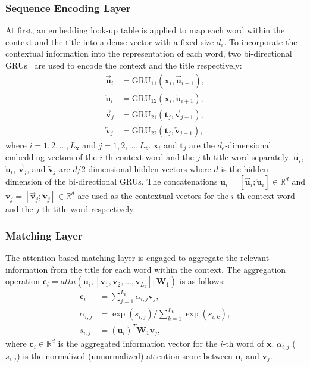 \documentclass[letterpaper]{article} %
\begin{document}
\subsubsection{Sequence Encoding Layer}
At first, an embedding look-up table is applied to map each word within the context and the title into a dense vector with a fixed size $d_e$. To incorporate the contextual information into the representation of each word, two bi-directional GRUs~\cite{cho2014learning} are used to encode the context and the title respectively:
\begin{align}
\overrightarrow{\textbf{u}}_i &= \text{GRU}_{11}(\textbf{x}_i, \overrightarrow{\textbf{u}}_{i-1}), \\
\overleftarrow{\textbf{u}}_i  &= \text{GRU}_{12}(\textbf{x}_i, \overleftarrow{\textbf{u}}_{i+1}), \\
\overrightarrow{\textbf{v}}_j &= \text{GRU}_{21}(\textbf{t}_j, \overrightarrow{\textbf{v}}_{j-1}),\\
\overleftarrow{\textbf{v}}_j  &= \text{GRU}_{22}(\textbf{t}_j, \overleftarrow{\textbf{v}}_{j+1}),
\end{align}
where $i=1,2,\dots,L_{\mathbf{x}}$ and $j=1,2,\dots,L_{\mathbf{t}}$. $\mathbf{x}_i$ and $\mathbf{t}_j$ are the $d_e$-dimensional embedding vectors of the $i$-th context word and the $j$-th title word separately. $\overrightarrow{\textbf{u}}_i$, $\overleftarrow{\textbf{u}}_i$, $\overrightarrow{\textbf{v}}_j$, and $\overleftarrow{\textbf{v}}_j$ are $d/2$-dimensional hidden vectors where $d$ is the hidden dimension of the bi-directional GRUs. The concatenations $\mathbf{u}_i = [\overrightarrow{\mathbf{u}}_i; \overleftarrow{\mathbf{u}}_i] \in \mathbb{R}^d$ and $\mathbf{v}_j = [\overrightarrow{\mathbf{v}}_j; \overleftarrow{\mathbf{v}}_j] \in \mathbb{R}^d$ are used as the contextual vectors for the $i$-th context word and the $j$-th title word respectively.

\subsubsection{Matching Layer}
The attention-based matching layer is engaged to aggregate the relevant information from the title for each word within the context. The aggregation operation $\mathbf{c}_i = attn(\mathbf{u}_i, [\mathbf{v}_1, \mathbf{v}_2,\dots, \mathbf{v}_{L_{\mathbf{t}}}]; \mathbf{W}_1)$ is as follows:
\begin{align}
    \mathbf{c}_i &=  \sum_{j=1}^{L_{\mathbf{t}}} \alpha_{i,j} \mathbf{v}_j, \\
    \alpha_{i,j} &= \exp(s_{i,j}) \slash \sum_{k=1}^{L_{\mathbf{t}}} \exp(s_{i,k}),\\
    s_{i,j} &= (\mathbf{u}_i)^T \mathbf{W}_1 \mathbf{v}_j,
\end{align}
where $\mathbf{c}_i \in \mathbb{R}^d$ is the aggregated information vector for the $i$-th word of $\mathbf{x}$. $\alpha_{i,j}$ ($s_{i,j}$) is the normalized (unnormalized) attention score between $\mathbf{u}_i$ and $\mathbf{v}_j$.
\end{document}
